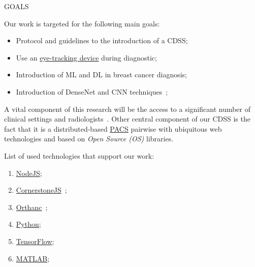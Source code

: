 \documentclass[final]{beamer}
\begin{document}
\begin{frame}[t, fragile = singleslide]{}
\begin{columns}[t]
\begin{column}{0.45\textwidth}
\begin{block}{GOALS}

\vspace{10mm}

Our work is targeted for the following main goals:

\vspace{10mm}

\begin{itemize}
\item Protocol and guidelines to the introduction of a CDSS;
\item Use an \hyperlink{https://gaming.tobii.com/products/}{eye-tracking device} during diagnostic;
\item Introduction of ML and DL in breast cancer diagnosis;
\item Introduction of DenseNet and CNN techniques~\cite{maicas2017deep};
\end{itemize}

\vspace{10mm}

A vital component of this research will be the access to a significant number of clinical settings and radiologists~\cite{calisto2017mimbcdui, https://doi.org/10.13140/rg.2.2.16566.14403/1}.
Other central component of our CDSS is the fact that it is a distributed-based \hyperlink{https://www.sciencedirect.com/topics/medicine-and-dentistry/picture-archiving-and-communication-system}{PACS} pairwise with ubiquitous web technologies and based on \textit{Open Source (OS)} libraries.

\vspace{10mm}

List of used technologies that support our work:

\vspace{10mm}

\begin{enumerate}
\item \hyperlink{https://nodejs.org}{NodeJS};
\item \hyperlink{https://cornerstonejs.org/}{CornerstoneJS}~\cite{hostetter2018integration};
\item \hyperlink{https://www.orthanc-server.com/}{Orthanc}~\cite{Jodogne:ISBI2013};
\item \hyperlink{https://www.python.org/}{Python};
\item \hyperlink{https://www.tensorflow.org/}{TensorFlow};
\item \hyperlink{https://www.mathworks.com/products/matlab.html}{MATLAB};
\end{enumerate}


\end{block}
\end{column}
\end{columns}
\end{frame}
\end{document}
